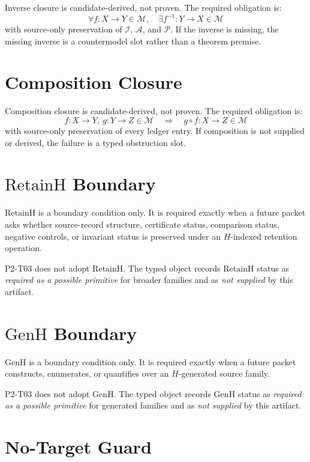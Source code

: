 \documentclass[11pt]{article}
\newcommand{\RetainH}{\mathrm{RetainH}}
\newcommand{\GenH}{\mathrm{GenH}}
\begin{document}
Inverse closure is candidate-derived, not proven. The required obligation is:
\[
  \forall f:X\to Y\in\mathcal{M},\quad
  \exists f^{-1}:Y\to X\in\mathcal{M}
\]
with source-only preservation of \(\mathcal{I}\), \(\mathcal{A}\), and
\(\mathcal{P}\). If the inverse is missing, the missing inverse is a
countermodel slot rather than a theorem premise.

\section{Composition Closure}

Composition closure is candidate-derived, not proven. The required obligation
is:
\[
  f:X\to Y,\ g:Y\to Z \in \mathcal{M}
  \quad\Longrightarrow\quad g\circ f:X\to Z\in\mathcal{M}
\]
with source-only preservation of every ledger entry. If composition is not
supplied or derived, the failure is a typed obstruction slot.

\section{\(\RetainH\) Boundary}

\(\RetainH\) is a boundary condition only. It is required exactly when a future
packet asks whether source-record structure, certificate status, comparison
status, negative controls, or invariant status is preserved under an
\(H\)-indexed retention operation.

P2-T03 does not adopt \(\RetainH\). The typed object records
\(\RetainH\) status as \emph{required as a possible primitive} for broader
families and as \emph{not supplied} by this artifact.

\section{\(\GenH\) Boundary}

\(\GenH\) is a boundary condition only. It is required exactly when a future
packet constructs, enumerates, or quantifies over an \(H\)-generated source
family.

P2-T03 does not adopt \(\GenH\). The typed object records \(\GenH\) status as
\emph{required as a possible primitive} for generated families and as
\emph{not supplied} by this artifact.

\section{No-Target Guard}
\end{document}
